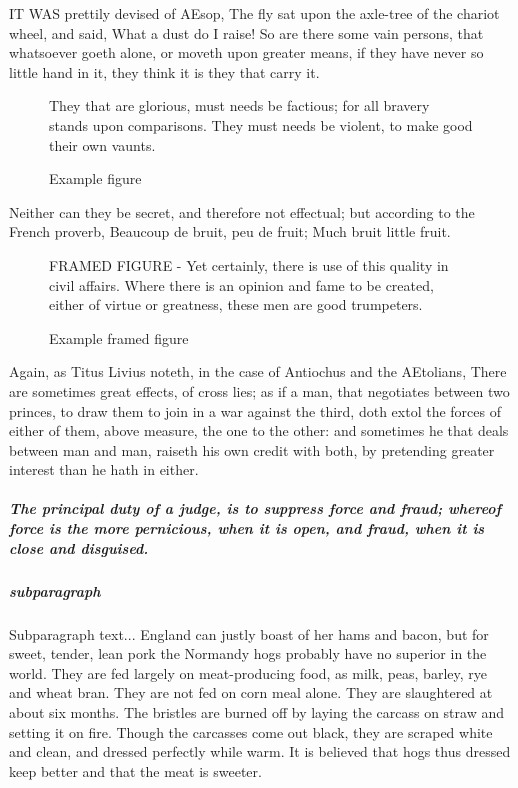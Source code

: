 \documentclass[a4paper, 12pt]{memoir}
\begin{document}
IT WAS prettily devised of AEsop, The fly sat upon the axle-tree of the chariot wheel, and said, What a dust do I raise! So are there some vain persons, that whatsoever goeth alone, or moveth upon greater means, if they have never so little hand in it, they think it is they that carry it. 

\begin{figure}
\centering

 They that are glorious, must needs be factious; for all bravery stands upon comparisons. They must needs be violent, to make good their own vaunts.

\caption{Example figure}\label{fig:noframe}
\end{figure}

 Neither can they be secret, and therefore not effectual; but according to the French proverb, Beaucoup de bruit, peu de fruit; Much bruit little fruit.


\begin{figure}
\centering
\begin{framed}\centering
FRAMED FIGURE - Yet certainly, there is use of this quality in civil affairs. Where there is an opinion and fame to be created, either of virtue or greatness, these men are good trumpeters.
\end{framed}
\caption{Example framed figure}\label{fig:framed}
\end{figure}

Again, as Titus Livius noteth, in the case of Antiochus and the AEtolians, There are sometimes great effects, of cross lies; as if a man, that negotiates between two princes, to draw them to join in a war against the third, doth extol the forces of either of them, above measure, the one to the other: and sometimes he that deals between man and man, raiseth his own credit with both, by pretending greater interest than he hath in either.

\subparagraph*{ The principal duty of a judge, is to suppress force and fraud; whereof force is the more pernicious, when it is open, and fraud, when it is close and disguised. }
\subparagraph*{subparagraph} 
Subparagraph text... England can justly boast of her hams and bacon, but for sweet, tender, lean pork the Normandy hogs probably have no superior in the world. They are fed largely on meat-producing food, as milk, peas, barley, rye and wheat bran. They are not fed on corn meal alone. They are slaughtered at about six months. The bristles are burned off by laying the carcass on straw and setting it on fire. Though the carcasses come out black, they are scraped white and clean, and dressed perfectly while warm. It is believed that hogs thus dressed keep better and that the meat is sweeter.
\end{document}
